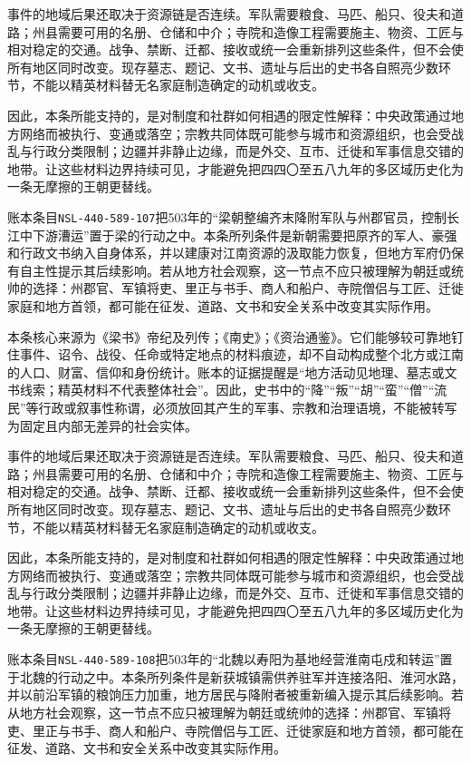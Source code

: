 事件的地域后果还取决于资源链是否连续。军队需要粮食、马匹、船只、役夫和道路；州县需要可用的名册、仓储和中介；寺院和造像工程需要施主、物资、工匠与相对稳定的交通。战争、禁断、迁都、接收或统一会重新排列这些条件，但不会使所有地区同时改变。现存墓志、题记、文书、遗址与后出的史书各自照亮少数环节，不能以精英材料替无名家庭制造确定的动机或收支。

因此，本条所能支持的，是对制度和社群如何相遇的限定性解释：中央政策通过地方网络而被执行、变通或落空；宗教共同体既可能参与城市和资源组织，也会受战乱与行政分类限制；边疆并非静止边缘，而是外交、互市、迁徙和军事信息交错的地带。让这些材料边界持续可见，才能避免把四四〇至五八九年的多区域历史化为一条无摩擦的王朝更替线。

账本条目\texttt{NSL-440-589-107}把503年的“梁朝整编齐末降附军队与州郡官员，控制长江中下游漕运”置于梁的行动之中。本条所列条件是新朝需要把原齐的军人、豪强和行政文书纳入自身体系，并以建康对江南资源的汲取能力恢复，但地方军府仍保有自主性提示其后续影响。若从地方社会观察，这一节点不应只被理解为朝廷或统帅的选择：州郡官、军镇将吏、里正与书手、商人和船户、寺院僧侣与工匠、迁徙家庭和地方首领，都可能在征发、道路、文书和安全关系中改变其实际作用。

本条核心来源为《梁书》帝纪及列传；《南史》；《资治通鉴》。它们能够较可靠地钉住事件、诏令、战役、任命或特定地点的材料痕迹，却不自动构成整个北方或江南的人口、财富、信仰和身份统计。账本的证据提醒是“地方活动见地理、墓志或文书线索；精英材料不代表整体社会”。因此，史书中的“降”“叛”“胡”“蛮”“僧”“流民”等行政或叙事性称谓，必须放回其产生的军事、宗教和治理语境，不能被转写为固定且内部无差异的社会实体。

事件的地域后果还取决于资源链是否连续。军队需要粮食、马匹、船只、役夫和道路；州县需要可用的名册、仓储和中介；寺院和造像工程需要施主、物资、工匠与相对稳定的交通。战争、禁断、迁都、接收或统一会重新排列这些条件，但不会使所有地区同时改变。现存墓志、题记、文书、遗址与后出的史书各自照亮少数环节，不能以精英材料替无名家庭制造确定的动机或收支。

因此，本条所能支持的，是对制度和社群如何相遇的限定性解释：中央政策通过地方网络而被执行、变通或落空；宗教共同体既可能参与城市和资源组织，也会受战乱与行政分类限制；边疆并非静止边缘，而是外交、互市、迁徙和军事信息交错的地带。让这些材料边界持续可见，才能避免把四四〇至五八九年的多区域历史化为一条无摩擦的王朝更替线。

账本条目\texttt{NSL-440-589-108}把503年的“北魏以寿阳为基地经营淮南屯戍和转运”置于北魏的行动之中。本条所列条件是新获城镇需供养驻军并连接洛阳、淮河水路，并以前沿军镇的粮饷压力加重，地方居民与降附者被重新编入提示其后续影响。若从地方社会观察，这一节点不应只被理解为朝廷或统帅的选择：州郡官、军镇将吏、里正与书手、商人和船户、寺院僧侣与工匠、迁徙家庭和地方首领，都可能在征发、道路、文书和安全关系中改变其实际作用。

